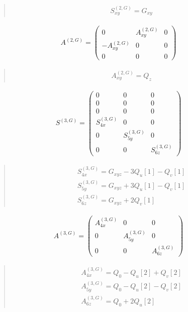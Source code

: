 \documentclass[fleqn,10pt]{jsarticle}
\begin{document}
\begin{quote}
\begin{align*}
& S^{(2,G)}_{xy} = G_{xy}
\end{align*}
\end{quote}
\begin{align*}
A^{(2,G)} = \begin{pmatrix} 0 & A^{(2,G)}_{xy} & 0 \\ - A^{(2,G)}_{xy} & 0 & 0 \\ 0 & 0 & 0 \end{pmatrix}
\end{align*}
\begin{quote}
\begin{align*}
& A^{(2,G)}_{xy} = Q_{z}
\end{align*}
\end{quote}
\begin{align*}
S^{(3,G)} = \begin{pmatrix} 0 & 0 & 0 \\ 0 & 0 & 0 \\ 0 & 0 & 0 \\ S^{(3,G)}_{4x} & 0 & 0 \\ 0 & S^{(3,G)}_{5y} & 0 \\ 0 & 0 & S^{(3,G)}_{6z} \end{pmatrix}
\end{align*}
\begin{quote}
\begin{align*}
& S^{(3,G)}_{4x} = G_{xyz} - 3 Q_{u}[1] - Q_{v}[1] \\
& S^{(3,G)}_{5y} = G_{xyz} + 3 Q_{u}[1] - Q_{v}[1] \\
& S^{(3,G)}_{6z} = G_{xyz} + 2 Q_{v}[1]
\end{align*}
\end{quote}
\begin{align*}
A^{(3,G)} = \begin{pmatrix} A^{(3,G)}_{4x} & 0 & 0 \\ 0 & A^{(3,G)}_{5y} & 0 \\ 0 & 0 & A^{(3,G)}_{6z} \end{pmatrix}
\end{align*}
\begin{quote}
\begin{align*}
& A^{(3,G)}_{4x} = Q_{0} - Q_{u}[2] + Q_{v}[2] \\
& A^{(3,G)}_{5y} = Q_{0} - Q_{u}[2] - Q_{v}[2] \\
& A^{(3,G)}_{6z} = Q_{0} + 2 Q_{u}[2]
\end{align*}
\end{quote}
\end{document}
